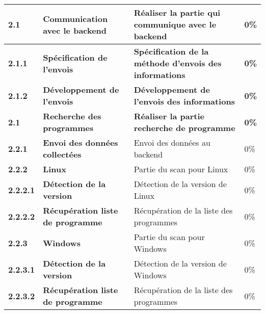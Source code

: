 \begin{supertabular}{|p{2.2cm} p{6cm}|p{5cm}|R{2cm}|}
  \textbf{2.1}  & \textbf{Communication avec le backend} & \textbf{Réaliser la partie qui communique avec le backend} & \textbf{0\%} \\
  \hline

  \hspace{6pt}
  \textbf{2.1.1}  & \textbf{Spécification de l'envois} & \textbf{Spécification de la méthode d'envois des informations} & \textbf{0\%} \\
  \hline

  \hspace{6pt}
  \textbf{2.1.2}  & \textbf{Développement de l'envois} & \textbf{Développement de l'envois des informations} & \textbf{0\%} \\
  \hline

  \textbf{2.1}  & \textbf{Recherche des programmes} & \textbf{Réaliser la partie recherche de programme} & \textbf{0\%} \\
  \hline


  \hspace{6pt}
  \textbf{2.2.1}  & \textbf{Envoi des données collectées} & Envoi des données au backend & 0\% \\
  \hline


  \hspace{6pt}
  \textbf{2.2.2}  & \textbf{Linux} & Partie du scan pour Linux & 0\% \\
  \hline

  \hspace{12pt}
  \textbf{2.2.2.1}  & \textbf{Détection de la version} & Détection de la version de Linux & 0\% \\
  \hline

  \hspace{12pt}
  \textbf{2.2.2.2}  & \textbf{Récupération liste de programme} & Récupération de la liste des programmes & 0\% \\
  \hline

  \hspace{6pt}
  \textbf{2.2.3}  & \textbf{Windows} & Partie du scan pour Windows & 0\% \\
  \hline

  \hspace{12pt}
  \textbf{2.2.3.1}  & \textbf{Détection de la version} & Détection de la version de Windows & 0\% \\
  \hline

  \hspace{12pt}
  \textbf{2.2.3.2}  & \textbf{Récupération liste de programme} & Récupération de la liste des programmes & 0\% \\
  \hline


\end{supertabular}
